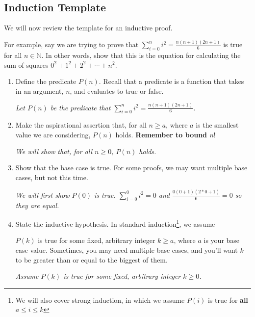 \documentclass[12pt,letterpaper]{article}
\newcommand\N{\mathbb N}
\begin{document}
 \subsection*{Induction Template}
 
      We will now review the template for an inductive proof.


      For example, say we are trying to prove that $\sum_{i=0}^n i^2 = \frac{n(n+1)(2n+1)}{6}$ is true for all $n \in \N$. In other words, show that this is the equation for calculating the sum of squares $0^2 + 1^2 + 2^2 + \cdots + n^2$.

      \begin{enumerate}
        \item Define the predicate $P(n)$. Recall that a predicate is a function that takes in an argument, $n$, and evaluates to true or false.
        
         \textit{Let $P(n)$ be the predicate that $\sum_{i=0}^n i^2 = \frac{n(n+1)(2n+1)}{6}$.}
        
        \item Make the aspirational assertion that, for all $n \geq a$, where $a$ is the smallest value we are considering, $P(n)$ holds. \textbf{Remember to bound $n$}! 
        
        \textit{We will show that, for all $n \geq 0$, $P(n)$ holds.}

        \item Show that the base case is true. For some proofs, we may want multiple base cases, but not this time.

        \textit{We will first show $P(0)$ is true. $\sum_{i=0}^0 i^2 = 0$ and $\frac{0(0+1)(2*0+1)}{6} = 0$ so they are equal.}

        \item State the inductive hypothesis. In standard induction\footnote{We will also cover strong induction, in which we assume $P(i)$ is true for \textbf{all} $a \le i \leq k$}, we assume 
        
        $P(k)$ is true for some fixed, arbitrary integer $k \geq a$, where $a$ is your base case value. Sometimes, you may need multiple base cases, and you'll want $k$ to be greater than or equal to the biggest of them.

        \textit{Assume $P(k)$ is true for some fixed, arbitrary integer $k \geq 0$.}


\end{enumerate}
\end{document}
